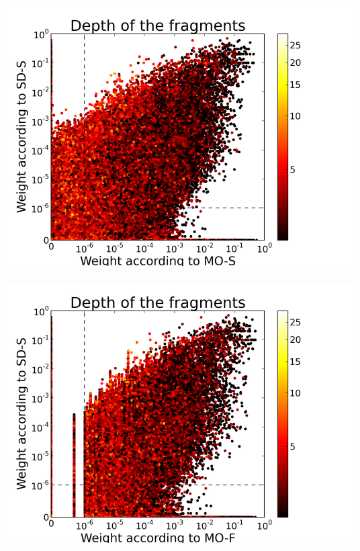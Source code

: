 \begin{figure}[t]
\center
\begin{subfigure}{0.32\textwidth}
\includegraphics[width=\linewidth,trim=0.5cm 0cm 2.5cm 0.5cm, clip=true]{../data/plots/0.png}
\caption{}
\label{f:SDS-MOS}
\end{subfigure}
\begin{subfigure}{0.32\textwidth}
\includegraphics[width=\linewidth,trim=0.5cm 0cm 2.5cm 0.5cm, clip=true]{../data/plots/1.png}
\caption{}
\label{f:SDS-MOF}
\end{subfigure}
\begin{subfigure}{0.32\textwidth}

\end{subfigure}
\end{figure}
